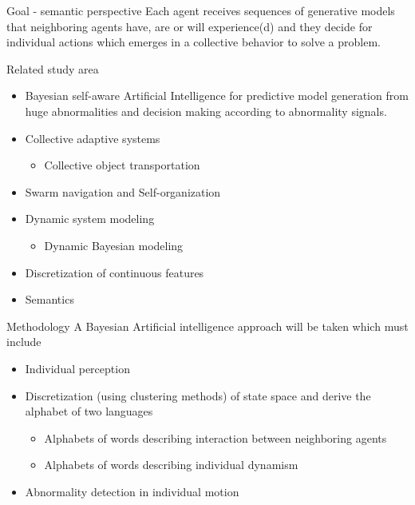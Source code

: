\documentclass[unknownkeysallowed]{beamer}
\begin{document}
	\begin{frame}{Goal - semantic perspective}
		Each agent receives sequences of generative models that neighboring agents have, are or will experience(d) and they decide for individual actions which emerges in a collective behavior to solve a problem.
	\end{frame}
	
	\begin{frame}{Related study area}
		\begin{itemize}
			\item Bayesian self-aware Artificial Intelligence for predictive model generation from huge abnormalities and decision making according to abnormality signals. 
			\item Collective adaptive systems
				\begin{itemize}
					\item Collective object transportation
				\end{itemize}
			\item Swarm navigation and Self-organization
			\item Dynamic system modeling
				\begin{itemize}
					\item Dynamic Bayesian modeling
				\end{itemize}
			\item Discretization of continuous features
			\item Semantics
		\end{itemize}
	\end{frame}

	\begin{frame}{Methodology}
		A Bayesian Artificial intelligence approach will be taken which must include
		\begin{itemize}
			\item Individual perception
			\item Discretization (using clustering methods) of state space and derive the alphabet of two languages
				\begin{itemize}
					\item Alphabets of words describing interaction between neighboring agents
					\item Alphabets of words describing individual dynamism 
				\end{itemize}
			\item Abnormality detection in individual motion
		\end{itemize}
	\end{frame}
\end{document}
